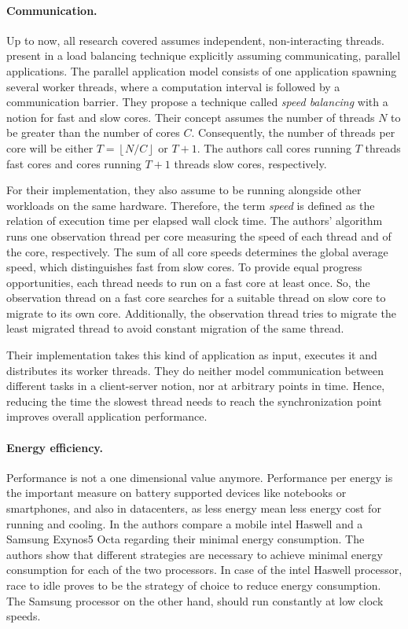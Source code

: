 \paragraph{Communication.}
Up to now, all research covered assumes independent, non-interacting threads.
\citeauthor{hofmeyr_load_2010} present in \cite{hofmeyr_load_2010} a load
balancing technique explicitly assuming communicating, parallel applications.
The parallel application model consists of one application
spawning several worker threads, where a computation interval is followed by a
communication barrier.
They propose a technique called \emph{speed balancing} with a notion for fast
and slow cores.
Their concept assumes the number of threads $N$ to be greater than the number of
cores $C$.
Consequently, the number of threads per core will be either
$T = \left \lfloor{N/C}\right \rfloor$ or $T+1$.
The authors call cores running $T$ threads fast cores and cores running $T+1$
threads slow cores, respectively.

For their implementation, they also assume to be running alongside other
workloads on the same hardware.
Therefore, the term \emph{speed} is defined as the relation of execution time per
elapsed wall clock time.
The authors' algorithm runs one observation thread per core measuring the speed
of each thread and of the core, respectively.
The sum of all core speeds determines the global average speed, which
distinguishes fast from slow cores.
To provide equal progress opportunities, each thread needs to run on a fast
core at least once.
So, the observation thread on a fast core searches for a suitable thread on slow
core to migrate to its own core.
Additionally, the observation thread tries to migrate the least migrated thread to
avoid constant migration of the same thread.

Their implementation takes this kind of application as input, executes it and
distributes its worker threads.
They do neither model communication between different tasks in a client-server
notion, nor at arbitrary points in time.
Hence, reducing the time the slowest thread needs to reach the synchronization
point improves overall application performance.
\\

\paragraph{Energy efficiency.}
Performance is not a one dimensional value anymore.
Performance per energy is the important measure on battery supported devices like
notebooks or smartphones, and also in datacenters, as less energy mean less
energy cost for running and cooling.
In \cite{imes_poet_2015} the authors compare a mobile \gls{intel} Haswell and a
Samsung Exynos5 Octa regarding their minimal energy consumption.
The authors show that different strategies are necessary to achieve minimal
energy consumption for each of the two processors.
In case of the \gls{intel} Haswell processor, race to idle proves to be the
strategy of choice to reduce energy consumption.
The Samsung processor on the other hand, should run constantly at low clock
speeds.

